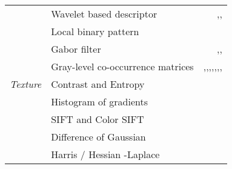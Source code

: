 \begin{table}[t]
\begin{center}
\begin{threeparttable}
{\begin{tabular}{l l r}
    \multirow{9}{*}{\textit{Texture}} & Wavelet based descriptor & \cite{garnavi2012computer},\textbf{\cite{situ2008malignant}},\textbf{\cite{situ2010modeling}}\\
    & Local binary pattern & \textbf{\cite{zortea2010automatic}}\\
    & Gabor filter & \cite{kreutz2001automated},\cite{dreiseitl2001comparison},\cite{capdehourat2009pigmented}\\
    & Gray-level co-occurrence matrices &  \cite{celebi2007methodological},\cite{iyatomi2008improved},\cite{Celebi2015},\cite{tasoulis2010skin},\cite{capdehourat2011toward},\cite{faal2013improving},\cite{schaefer2014ensemble},\textbf{\cite{situ2008malignant}}\\
    & Contrast and Entropy & \cite{rubegni2002automated}\\ 
    & Histogram of gradients & \textbf{\cite{barata2013two}}\\
    & SIFT and Color SIFT & \textbf{\cite{situ2010modeling}}\\
    & Difference of Gaussian & \textbf{\cite{barata2013role}}\\
    & Harris / Hessian -Laplace & \textbf{\cite{barata2013role}}\\ 
    [+1.5ex] 
    \hline %
  \end{tabular}
  }
  \end{threeparttable}
\end{center}
\label{tab:dermoscopy_Feature}
\end{table}